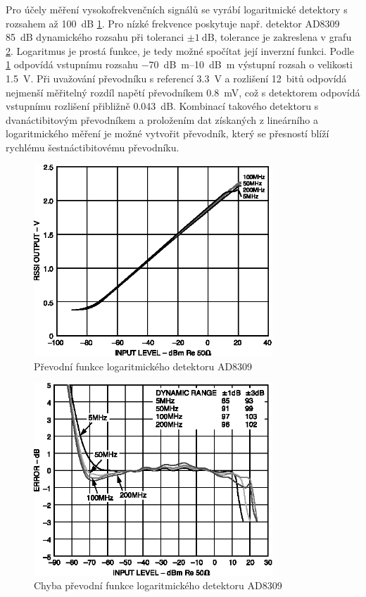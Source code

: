 Pro účely měření vysokofrekvenčních signálů se vyrábí logaritmické detektory s rozsahem až \SI{100}{\deci\bel} \cite{AD8309datasheet} \ref{ad8309function}. Pro nízké frekvence poskytuje např. detektor AD8309 \SI{85}{\deci\bel} dynamického rozsahu při toleranci $\pm \SI{1}{\deci\bel}$, tolerance je zakreslena v grafu \ref{ad8309error}. Logaritmus je prostá funkce, je tedy možné spočítat její inverzní funkci. Podle \ref{ad8309function} odpovídá vstupnímu rozsahu \SIrange{-70}{10}{\deci\bel m} výstupní rozsah o velikosti \SI{1.5}{\volt}. Při uvažování převodníku s referencí \SI{3.3}{\volt} a rozlišení 12~bitů odpovídá nejmenší měřitelný rozdíl napětí převodníkem \SI{0.8}{\milli\volt}, což s detektorem odpovídá vstupnímu rozlišení přibližně \SI{0.043}{\deci\bel}. Kombinací takového detektoru s dvanáctibitovým převodníkem a proložením dat získaných z lineárního a logaritmického měření je možné vytvořit převodník, který se přesností blíží rychlému šestnáctibitovému převodníku.

\begin{figure}[htbp]\includegraphics[width=0.8\textwidth,keepaspectratio]{images/AD8309_function.eps}\caption{Převodní funkce logaritmického detektoru AD8309 \cite{AD8309datasheet}}\label{ad8309function}\end{figure}	

\begin{figure}[htbp]\includegraphics[width=0.8\textwidth,keepaspectratio]{images/AD8309_error.eps}\caption{Chyba převodní funkce logaritmického detektoru AD8309 \cite{AD8309datasheet}}\label{ad8309error}\end{figure}

